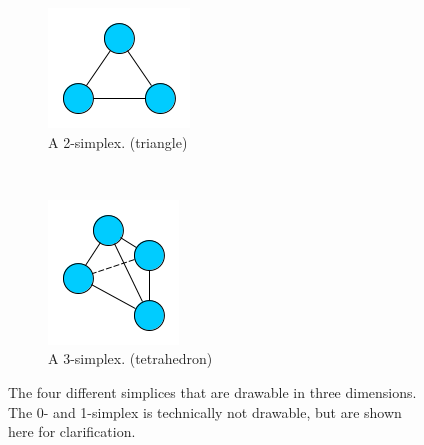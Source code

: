 \begin{figure}[h!]
\begin{subfigure}[b]{0.3\textwidth}
                \includegraphics[width=\textwidth]{img/2simplex.png}
                \caption{A 2-simplex. (triangle)}
                \label{fig:2simplex}
        \end{subfigure}%
        ~
        \begin{subfigure}[b]{0.2\textwidth}
                \includegraphics[width=\textwidth]{img/3simplex.png}
                \caption{A 3-simplex. (tetrahedron)}
                \label{fig:3simplex}
        \end{subfigure}

        \caption{The four different simplices that are drawable in three dimensions.
                 The 0- and 1-simplex is technically not drawable, but are shown
                 here for clarification.}
        \label{fig:simplices}
\end{figure}

